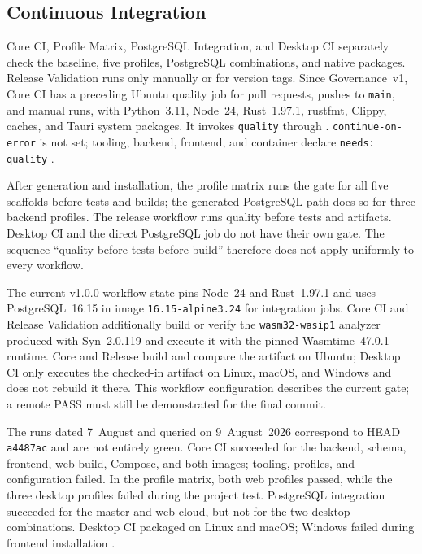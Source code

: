 \subsection{Continuous Integration}
\label{subsec:continuous-integration}

Core CI, Profile Matrix, PostgreSQL Integration, and Desktop CI separately
check the baseline, five profiles, PostgreSQL combinations, and native
packages. Release Validation runs only manually or for version tags. Since
Governance~v1, Core CI has a preceding Ubuntu quality job for pull requests,
pushes to \texttt{main}, and manual runs, with Python~3.11, Node~24,
Rust~1.97.1, rustfmt, Clippy, caches, and Tauri system packages. It invokes
\texttt{quality} through .
\texttt{continue-on-error} is not set; tooling, backend, frontend, and
container declare \texttt{needs: quality}
\parencite{kleiveist2026quality-ci}.

After generation and installation, the profile matrix runs the gate for all
five scaffolds before tests and builds; the generated PostgreSQL path does so
for three backend profiles. The release workflow runs quality before tests and
artifacts. Desktop CI and the direct PostgreSQL job do not have their own gate.
The sequence \enquote{quality before tests before build} therefore does not
apply uniformly to every workflow.

The current v1.0.0 workflow state pins Node~24 and Rust~1.97.1 and uses
PostgreSQL~16.15 in image \texttt{16.15-alpine3.24} for integration jobs. Core
CI and Release Validation additionally build or verify the
\texttt{wasm32-wasip1} analyzer produced with Syn~2.0.119 and execute it with
the pinned Wasmtime~47.0.1 runtime. Core and Release build and compare the
artifact on Ubuntu; Desktop CI only executes the checked-in artifact on Linux,
macOS, and Windows and does not rebuild it there. This workflow configuration
describes the current gate; a remote PASS must still be demonstrated for the
final commit.

The runs dated 7~August and queried on 9~August~2026 correspond to HEAD
\texttt{a4487ac} and are not entirely green. Core CI succeeded for the
backend, schema, frontend, web build, Compose, and both images; tooling,
profiles, and configuration failed. In the profile matrix, both web profiles
passed, while the three desktop profiles failed during the project test.
PostgreSQL integration succeeded for the master and web-cloud, but not for the
two desktop combinations. Desktop CI packaged on Linux and macOS; Windows
failed during frontend installation
\parencite{kleiveist2026ci-core-run,kleiveist2026ci-profiles-run,kleiveist2026ci-postgres-run,kleiveist2026ci-desktop-run}.

